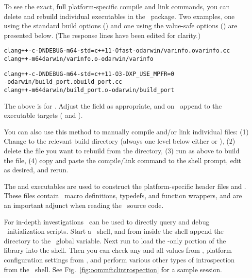 To see the exact, full platform-specific compile and link commands, you
can delete and rebuild individual executables in the
\OOMMF\ package. Two examples, one using the standard build options
() and one using the value-safe options
() are presented below. (The response
lines have been edited for clarity.)
\begin{alltt}
% \shellcmd{cd pkg/oc}
% \shellcmd{tclsh ../../oommf.tcl pimake clean}
% \shellcmd{tclsh ../../oommf.tcl pimake darwin/varinfo}
clang++ -c -DNDEBUG -m64 -std=c++11 -Ofast -o darwin/varinfo.o varinfo.cc
clang++ -m64 darwin/varinfo.o -o darwin/varinfo

% \shellcmd{cd ../..}
% \shellcmd{cd pkg/xp}
% \shellcmd{tclsh ../../oommf.tcl pimake clean}
% \shellcmd{tclsh ../../oommf.tcl pimake darwin/build_port}
clang++ -c -DNDEBUG -m64 -std=c++11 -O3 -DXP_USE_MPFR=0
   -o darwin/build_port.o build_port.cc
clang++ -m64 darwin/build_port.o -o darwin/build_port
\end{alltt}\html{\newline}
The above is for \MacOSX. Adjust the  field as appropriate,
and on \Windows\ append  to the executable targets (
and ).

You can also use this method to manually compile and/or link individual
files: (1) Change to the relevant build directory (always one level below
either  or ), (2) delete the file you want to rebuild from
the  directory, (3) run  as above to build the
file, (4) copy and paste the compile/link command to the shell prompt,
edit as desired, and rerun.

The  and  executables are
used to construct the platform-specific header files
 and
. These files contain
\Cplusplus\ macro definitions, typedefs, and function wrappers,
and are an important adjunct when reading the \OOMMF\ source code.

For in-depth investigations \Tcl\ can be used to directly query and debug
\OOMMF\ initialization scripts. Start a \Tcl\ shell, and from inside the
shell append the \OOMMF\  directory to the \Tcl\ global
 variable. Next run  to load the
\Tcl-only portion of the \OOMMF\  library into the shell. Then
you can check any and all  values from
, platform configuration settings from
, and perform various other types of
introspection from the \Tcl\ shell. See
Fig.~\ref{fig:oommftclintrospection} for a sample session.

